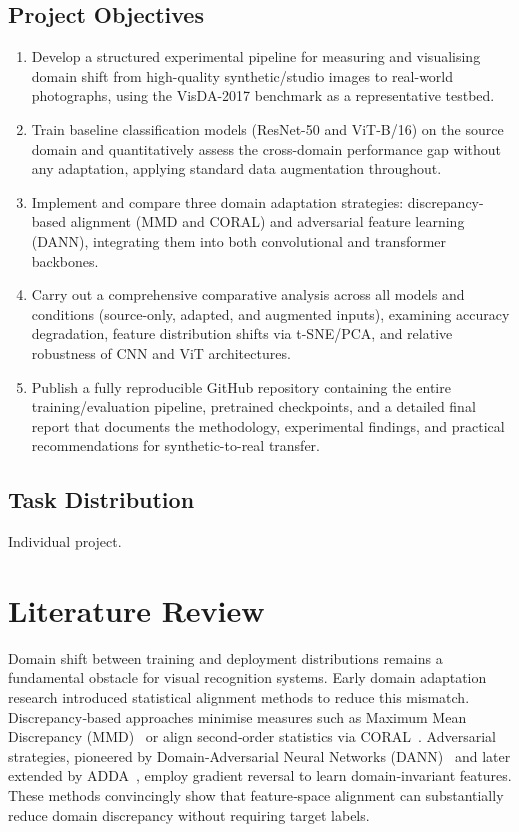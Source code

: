 \documentclass[a4paper,12pt]{extarticle}
\begin{document}
\subsection{Project Objectives}
\begin{enumerate}
	\item Develop a structured experimental pipeline for measuring and visualising domain shift from high-quality
	      synthetic/studio images to real-world photographs, using the VisDA-2017 benchmark as a representative testbed.
	\item Train baseline classification models (ResNet-50 and ViT-B/16) on the source domain and quantitatively assess the
	      cross-domain performance gap without any adaptation, applying standard data augmentation throughout.
	\item Implement and compare three domain adaptation strategies: discrepancy-based alignment (MMD and CORAL) and adversarial
	      feature learning (DANN), integrating them into both convolutional and transformer backbones.
	\item Carry out a comprehensive comparative analysis across all models and conditions (source-only, adapted, and augmented
	      inputs), examining accuracy degradation, feature distribution shifts via t-SNE/PCA, and relative robustness of CNN and
	      ViT architectures.
	\item Publish a fully reproducible GitHub repository containing the entire training/evaluation pipeline, pretrained
	      checkpoints, and a detailed final report that documents the methodology, experimental findings, and practical
	      recommendations for synthetic-to-real transfer.
\end{enumerate}

\subsection{Task Distribution}
Individual project.

\section{Literature Review}
\label{sec:litreview}

Domain shift between training and deployment distributions remains a fundamental obstacle for visual recognition
systems. Early domain adaptation research introduced statistical alignment methods to reduce this mismatch.
Discrepancy‑based approaches minimise measures such as Maximum Mean Discrepancy (MMD)~\cite{gretton2012kernel,
	long2015learning} or align second‑order statistics via CORAL~\cite{sun2016deep}. Adversarial strategies, pioneered by
Domain‑Adversarial Neural Networks (DANN)~\cite{ganin2016domain} and later extended by
ADDA~\cite{tzeng2017adversarial}, employ gradient reversal to learn domain‑invariant features. These methods
convincingly show that feature‑space alignment can substantially reduce domain discrepancy without requiring target
labels.
\end{document}
